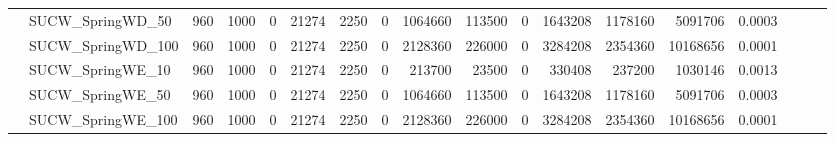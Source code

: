 \begin{landscape}
\begin{longtable}[c]{llrrrrrrrrrrrrrlll}
		& SUCW\_SpringWD\_50           & 960                         & 1000                       & 0                          & 21274                       & 2250                       & 0                          & 1064660                    & 113500                    & 0                         & 1643208                    & 1178160                    & 5091706                        & 0.0003                        &                          &                          &                          \\
		& SUCW\_SpringWD\_100          & 960                         & 1000                       & 0                          & 21274                       & 2250                       & 0                          & 2128360                    & 226000                    & 0                         & 3284208                    & 2354360                    & 10168656                       & 0.0001                        &                          &                          &                          \\
		& SUCW\_SpringWE\_10           & 960                         & 1000                       & 0                          & 21274                       & 2250                       & 0                          & 213700                     & 23500                     & 0                         & 330408                     & 237200                     & 1030146                        & 0.0013                        &                          &                          &                          \\
		& SUCW\_SpringWE\_50           & 960                         & 1000                       & 0                          & 21274                       & 2250                       & 0                          & 1064660                    & 113500                    & 0                         & 1643208                    & 1178160                    & 5091706                        & 0.0003                        &                          &                          &                          \\
		& SUCW\_SpringWE\_100          & 960                         & 1000                       & 0                          & 21274                       & 2250                       & 0                          & 2128360                    & 226000                    & 0                         & 3284208                    & 2354360                    & 10168656                       & 0.0001                        &                          &                          &                          \\

\end{longtable}
\end{landscape}
